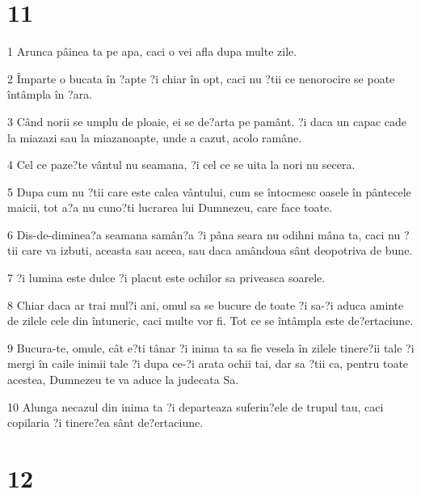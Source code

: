 \chapter{11}

\par 1 Arunca pâinea ta pe apa, caci o vei afla dupa multe zile.
\par 2 Împarte o bucata în ?apte ?i chiar în opt, caci nu ?tii ce nenorocire se poate întâmpla în ?ara.
\par 3 Când norii se umplu de ploaie, ei se de?arta pe pamânt. ?i daca un capac cade la miazazi sau la miazanoapte, unde a cazut, acolo ramâne.
\par 4 Cel ce paze?te vântul nu seamana, ?i cel ce se uita la nori nu secera.
\par 5 Dupa cum nu ?tii care este calea vântului, cum se întocmesc oasele în pântecele maicii, tot a?a nu cuno?ti lucrarea lui Dumnezeu, care face toate.
\par 6 Dis-de-diminea?a seamana samân?a ?i pâna seara nu odihni mâna ta, caci nu ?tii care va izbuti, aceasta sau aceea, sau daca amândoua sânt deopotriva de bune.
\par 7 ?i lumina este dulce ?i placut este ochilor sa priveasca soarele.
\par 8 Chiar daca ar trai mul?i ani, omul sa se bucure de toate ?i sa-?i aduca aminte de zilele cele din întuneric, caci multe vor fi. Tot ce se întâmpla este de?ertaciune.
\par 9 Bucura-te, omule, cât e?ti tânar ?i inima ta sa fie vesela în zilele tinere?ii tale ?i mergi în caile inimii tale ?i dupa ce-?i arata ochii tai, dar sa ?tii ca, pentru toate acestea, Dumnezeu te va aduce la judecata Sa.
\par 10 Alunga necazul din inima ta ?i departeaza suferin?ele de trupul tau, caci copilaria ?i tinere?ea sânt de?ertaciune.

\chapter{12}

